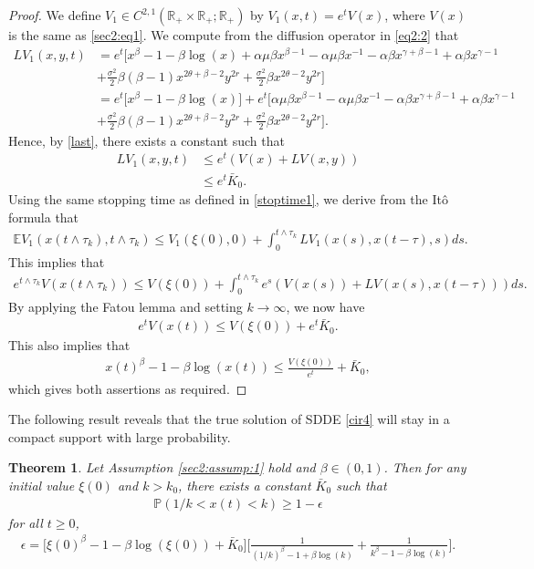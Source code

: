 \documentclass[11pt]{article}
\newtheorem{theorem}[definition]{Theorem}
\begin{document}
\begin{proof}
We define $V_1\in C^{2,1}(\mathbb{R}_+\times \mathbb{R}_+;\mathbb{R}_+)$ by $V_1(x,t)=e^tV(x)$, where $V(x)$ is  the same as \eqref{sec2:eq1}. We compute from the diffusion operator in \eqref{eq2:2} that
\begin{align*}
LV_1(x,y,t)&=e^t\Big[x^{\beta}-1-\beta\log(x)+\alpha\mu\beta x^{\beta-1}-\alpha\mu\beta x^{-1}-\alpha\beta x^{\gamma+\beta-1}+\alpha\beta x^{\gamma-1}\\
&+\frac{\sigma^2}{2}\beta(\beta-1)x^{2\theta+\beta-2}y^{2r}+\frac{\sigma^2}{2}\beta x^{2\theta-2}y^{2r}\Big]\\
&=e^t\Big[x^{\beta}-1-\beta\log(x)\Big]+e^t\Big[\alpha\mu\beta x^{\beta-1}-\alpha\mu\beta x^{-1}-\alpha\beta x^{\gamma+\beta-1}+\alpha\beta x^{\gamma-1}\\
&+\frac{\sigma^2}{2}\beta(\beta-1)x^{2\theta+\beta-2}y^{2r}+\frac{\sigma^2}{2}\beta x^{2\theta-2}y^{2r}\Big].
\end{align*}
Hence, by \eqref{last}, there exists a constant such that
\begin{align*}
LV_1(x,y,t)&\le e^t(V(x)+LV(x,y))\\
&\le e^t\bar{K}_0.
\end{align*}
Using the same stopping time as defined in \eqref{stoptime1}, we derive from the It\^{o} formula that
\begin{align*}
\mathbb{E}V_1(x(t\wedge \tau_k),t\wedge \tau_k)\le V_1(\xi(0),0)+\int_0^{t\wedge \tau_k} LV_1(x(s),x(t-\tau),s)ds.
\end{align*}
This implies that
\begin{align*}
e^{t\wedge \tau_k}V(x(t\wedge \tau_k))\le V(\xi(0))+\int_0^{t\wedge \tau_k}e^s(V(x(s))+ LV(x(s),x(t-\tau)))ds.
\end{align*}
By applying the Fatou lemma and setting $k\rightarrow \infty$, we now have
\begin{align*}
e^tV(x(t))\le V(\xi(0))+e^t\bar{K}_0.
\end{align*}
This also implies that
\begin{align*}
x(t)^{\beta}-1-\beta\log(x(t))\le \frac{V(\xi(0))}{e^t}+\bar{K}_0,
\end{align*}
which gives both assertions as required. 
\end{proof}
The following result reveals that the true solution of SDDE \eqref{cir4} will stay in a compact support with large probability.
\begin{theorem}
Let Assumption \ref{sec2:assump:1} hold and $\beta\in(0,1)$.  Then for any initial value $\xi(0)$ and $k>k_0$, there exists a constant $\bar{K}_0$ such that 
\begin{align*}
\mathbb{P}(1/k< x(t)< k)\ge 1-\epsilon
\end{align*}
for all $t\ge 0$,
\begin{align*}
\epsilon=\Big[\xi(0)^{\beta}-1-\beta\log(\xi(0))+\bar{K}_0\Big]\Big[
\frac{1}{(1/k)^{\beta}-1+\beta\log(k)} +\frac{1}{k^{\beta}-1-\beta\log(k)}\Big].
\end{align*}
\end{theorem}
\end{document}
